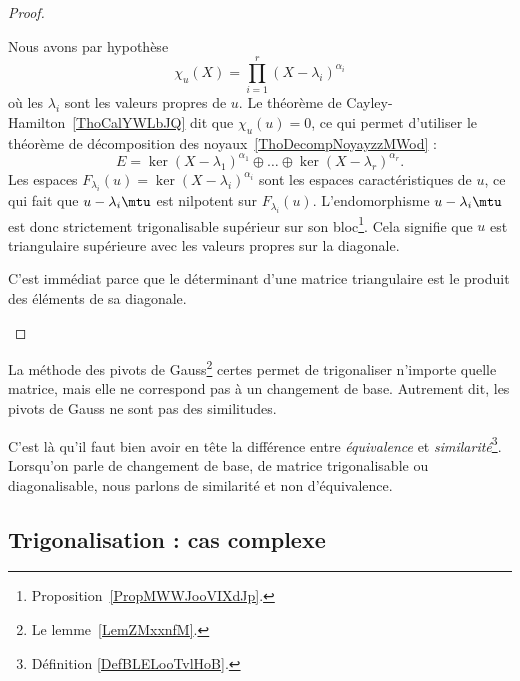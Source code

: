 \begin{proof}
	\begin{subproof}
		\spitem[\ref{ItemZKDMooOrTHkwii}\( \Rightarrow\)\ref{ItemZKDMooOrTHkwi}]
		Nous avons par hypothèse
		\begin{equation}
			\chi_u(X)=\prod_{i=1}^r(X-\lambda_i)^{\alpha_i}
		\end{equation}
		où les \( \lambda_i\) sont les valeurs propres de \( u\). Le théorème de Cayley-Hamilton~\ref{ThoCalYWLbJQ} dit que \( \chi_u(u)=0\), ce qui permet d'utiliser le théorème de décomposition des noyaux~\ref{ThoDecompNoyayzzMWod} :
		\begin{equation}
			E=\ker(X-\lambda_1)^{\alpha_1}\oplus\ldots\oplus\ker(X-\lambda_r)^{\alpha_r}.
		\end{equation}
		Les espaces \( F_{\lambda_i}(u)=\ker(X-\lambda_i)^{\alpha_i}\) sont les espaces caractéristiques de \( u\), ce qui fait que \( u-\lambda_i\mtu\) est nilpotent sur \( F_{\lambda_i}(u)\). L'endomorphisme \( u-\lambda_i\mtu\) est donc strictement trigonalisable supérieur sur son bloc\footnote{Proposition~\ref{PropMWWJooVIXdJp}.}. Cela signifie que \( u\) est triangulaire supérieure avec les valeurs propres sur la diagonale.

		\spitem[\ref{ItemZKDMooOrTHkwi}\( \Rightarrow\)\ref{ItemZKDMooOrTHkwii}]

		C'est immédiat parce que le déterminant d'une matrice triangulaire est le produit des éléments de sa diagonale.
	\end{subproof}
\end{proof}

\begin{remark}
	La méthode des pivots de Gauss\footnote{Le lemme~\ref{LemZMxxnfM}.} certes permet de trigonaliser n'importe quelle matrice, mais elle ne correspond pas à un changement de base. Autrement dit, les pivots de Gauss ne sont pas des similitudes.

	C'est là qu'il faut bien avoir en tête la différence entre \emph{équivalence} et \emph{similarité}\footnote{Définition \ref{DefBLELooTvlHoB}.}. Lorsqu'on parle de changement de base, de matrice trigonalisable ou diagonalisable, nous parlons de similarité et non d'équivalence.
\end{remark}

\subsection{Trigonalisation : cas complexe}

